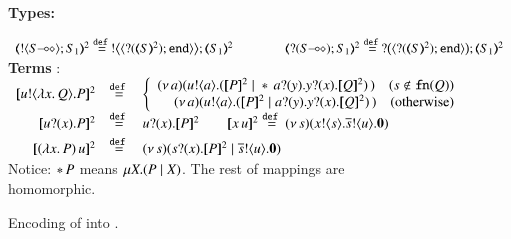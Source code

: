 \begin{figure}[th]
{\bf Types:}

$
	\begin{array}{c}
		\tmap{\btout{\lhot{S}}S_1}{2} \defeq \bbtout{\chtype{\btinp{\tmap{S}{2}}\tinact}}\tmap{S_1}{2}
		\qquad
		\qquad
		\tmap{\btinp{\lhot{S}}S_1}{2} \defeq \bbtinp{\chtype{\btinp{\tmap{S}{2}}\tinact}}\tmap{S_1}{2}
	\end{array}
$
\\[2mm]
{\bf Terms} :
\\
$
\begin{array}{rcll}
	\pmap{\bout{u}{\abs{x}{Q}} P}{2} & \defeq  &
	\left\{
	\begin{array}{r}
		\newsp{a}{\bout{u}{a} (\pmap{P}{2} \Par \repl{} \binp{a}{y} \binp{y}{x} \pmap{Q}{2})\,}\quad
		(s \notin \fn{Q})
		\\
		\newsp{a}{\bout{u}{a} (\pmap{P}{2} \Par \binp{a}{y} \binp{y}{x} \pmap{Q}{2})\,}\quad
		\textrm{(otherwise)} %
	\end{array}
	\right.
	\\[1mm]

	\pmap{\binp{u}{x} P}{2} &\defeq&  \binp{u}{x} \pmap{P}{2}
	\qquad
	\pmap{\appl{x}{u}}{2} \defeq \newsp{s}{\bout{x}{s} \bout{\dual{s}}{u} \inact}
	\\[1mm]

	\pmap{\appl{(\abs{x}{P})}{u}}{2} & \defeq & %
	\newsp{s}{\binp{s}{x} \pmap{P}{2} \Par \bout{\dual{s}}{u} \inact}
\end{array}
$
\\[2mm]
{Notice: $\repl{} P$ means $\recp{X}{(P \Par \rvar{X})}$. The rest of mappings are homomorphic.}
\caption{Encoding of \HOp into \sessp. \label{f:enc:ho_to_sessp}}
\end{figure}

